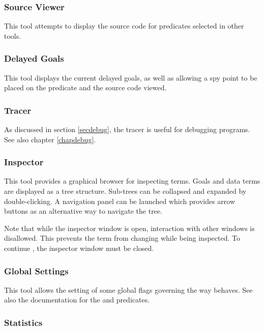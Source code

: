 \subsubsection{Source Viewer}

This tool attempts to display the source code for predicates selected in
other tools.

\subsubsection{Delayed Goals}

This tool displays the current delayed goals, as well as allowing a spy
point to be placed on the predicate and the source code viewed.

\subsubsection{Tracer}

As discussed in section \ref{secdebug}, the tracer is useful for debugging
programs.
See also chapter \ref{chapdebug}.

\subsubsection{Inspector}

This tool provides a graphical browser for inspecting terms.
Goals and data terms are displayed as a tree structure.
Sub-trees can be collapsed and expanded by double-clicking.
A navigation panel can be launched which provides arrow buttons as an
alternative way to navigate the tree.

Note that while the inspector window is open, interaction with other
{\tkeclipse} windows is disallowed.
This prevents the term from changing while being inspected.
To continue {\tkeclipse}, the inspector window must be closed.

\subsubsection{Global Settings}

This tool allows the setting of some global flags governing the way
{\eclipse} behaves.
See also the documentation for the
 and
 predicates.

\subsubsection{Statistics}

